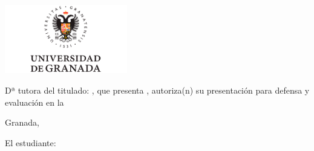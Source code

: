 \thispagestyle{empty}

\cleardoublepage

\thispagestyle{empty}

    \begin{minipage}{\textwidth}
        \centering
            \includegraphics[width=0.4\textwidth]{assets/images/portada/logo_ugr_new.png}
     \end{minipage}


    \begin{minipage}{\textwidth}
        \vspace*{3em}
        
        Dª {\nombreTutorUno} tutora del {\tituloTrabajo} titulado: \textbf{\tituloProyecto}, que presenta \nombreAlumno, autoriza(n) su presentación para defensa y evaluación en la {\etsiitname}
     \end{minipage}



	\begin{minipage}{\textwidth}
        \vspace*{4.3cm}
        \begin{center}
            Granada, \fechaParaHojaDeFirma
        \end{center}
        
        \vspace{1cm}
        \hspace{-0.45cm} El estudiante: \hspace{7.8cm}{Los tutores:}
    \end{minipage}




